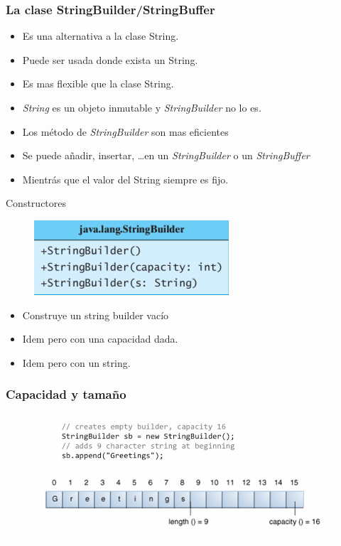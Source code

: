 \documentclass{beamer}
\begin{document}
\begin{frame}
\frametitle{La clase StringBuilder/StringBuffer}
\begin{footnotesize}
\begin{itemize}[<+->]
\item Es una alternativa a la clase String.
\item Puede ser usada donde exista un String.
\item Es mas flexible que la clase String.
\item \emph{String} es un objeto inmutable y \emph{StringBuilder} no lo es.
\item Los método de \emph{StringBuilder} son mas eficientes
\item Se puede añadir, insertar, \dots en un \emph{StringBuilder} o un \emph{StringBuffer}
\item Mientrás que el valor del String siempre es fijo.
\end{itemize}
\end{footnotesize}
\pause
\begin{block}{Constructores}
\begin{figure}
\includegraphics[scale=0.7]{imagenes/sb1.png}
\end{figure}
\end{block}
\pause
\begin{footnotesize}
\begin{itemize}[<+->]
\item Construye un string builder vacío
\item Idem pero con una capacidad dada.
\item Idem pero con un string.
\end{itemize}
\end{footnotesize}
\end{frame}

\begin{frame}
\frametitle{Capacidad y tamaño}
\begin{figure}
\includegraphics[scale=0.5]{imagenes/capacidad.png}
\end{figure}
\end{frame}
\end{document}
